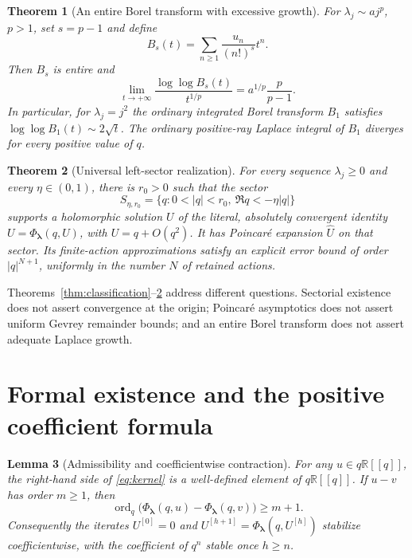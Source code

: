 \documentclass[11pt,a4paper]{article}
\numberwithin{equation}{section}
\newtheorem{theorem}{Theorem}[section]
\newtheorem{lemma}[theorem]{Lemma}
\theoremstyle{definition}
\theoremstyle{remark}
\newcommand{\R}{\mathbb R}
\newcommand{\val}{\operatorname{ord}_q}
\newcommand{\lam}{\boldsymbol\lambda}
\newcommand{\PhiL}{\Phi_{\lam}}
\newcommand{\Uhat}{\widehat U}
\begin{document}
\begin{theorem}[An entire Borel transform with excessive growth]
\label{thm:borelintro}
For $\lambda_j\sim a j^p$, $p>1$, set $s=p-1$ and define
\[
 B_s(t)=\sum_{n\ge1}\frac{u_n}{(n!)^s}t^n.
\]
Then $B_s$ is entire and
\begin{equation}
 \lim_{t\to+\infty}\frac{\log\log B_s(t)}{t^{1/p}}
 =a^{1/p}\frac{p}{p-1}.
 \label{eq:doublelog}
\end{equation}
In particular, for $\lambda_j=j^2$ the ordinary integrated Borel transform
$B_1$ satisfies $\log\log B_1(t)\sim2\sqrt t$.  The ordinary positive-ray
Laplace integral of $B_1$ diverges for every positive value of $q$.
\end{theorem}

\begin{theorem}[Universal left-sector realization]
\label{thm:sectorintro}
For every sequence $\lambda_j\ge0$ and every $\eta\in(0,1)$, there is
$r_0>0$ such that the sector
\[
 S_{\eta,r_0}=\{q:0<|q|<r_0,\ \Re q<-\eta|q|\}
\]
supports a holomorphic solution $U$ of the literal, absolutely convergent
identity $U=\PhiL(q,U)$, with $U=q+O(q^2)$.  It has Poincar\'e expansion
$\Uhat$ on that sector.  Its finite-action approximations satisfy an
explicit error bound of order $|q|^{N+1}$, uniformly in the number $N$ of
retained actions.
\end{theorem}

Theorems~\ref{thm:classification}--\ref{thm:sectorintro} address different
questions.  Sectorial existence does not assert convergence at the origin;
Poincar\'e asymptotics does not assert uniform Gevrey remainder bounds;
and an entire Borel transform does not assert adequate Laplace growth.

\section{Formal existence and the positive coefficient formula}
\label{sec:formal}

\begin{lemma}[Admissibility and coefficientwise contraction]
\label{lem:formal}
For any $u\in q\R[[q]]$, the right-hand side of \eqref{eq:kernel} is a
well-defined element of $q\R[[q]]$.  If $u-v$ has order $m\ge1$, then
\[
 \val\bigl(\PhiL(q,u)-\PhiL(q,v)\bigr)\ge m+1.
\]
Consequently the iterates $U^{[0]}=0$ and
$U^{[h+1]}=\PhiL(q,U^{[h]})$ stabilize coefficientwise, with the coefficient
of $q^n$ stable once $h\ge n$.
\end{lemma}
\end{document}
